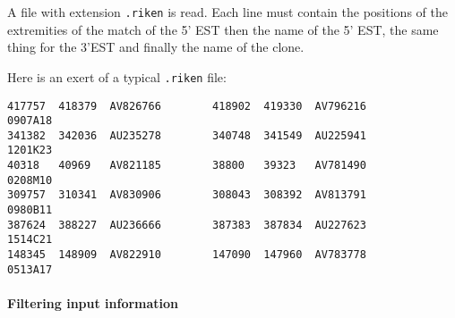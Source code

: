 A file with extension \texttt{.riken} is read.  Each line must contain
the positions of the extremities of the match of the 5' EST then the
name of the 5' EST, the same thing for the 3'EST and finally the name
of the clone.

Here is an exert of a typical \texttt{.riken} file:
\begin{Verbatim}[fontsize=\small]
417757  418379  AV826766        418902  419330  AV796216        0907A18
341382  342036  AU235278        340748  341549  AU225941        1201K23
40318   40969   AV821185        38800   39323   AV781490        0208M10
309757  310341  AV830906        308043  308392  AV813791        0980B11
387624  388227  AU236666        387383  387834  AU227623        1514C21
148345  148909  AV822910        147090  147960  AV783778        0513A17
\end{Verbatim}

\paragraph{Filtering input information}

